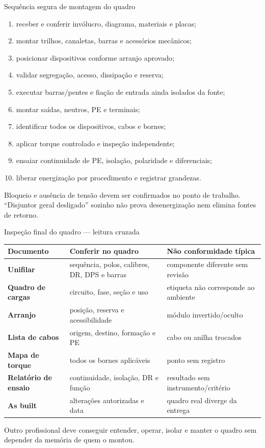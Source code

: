 \begin{frame}{Sequência segura de montagem do quadro}
\scriptsize
\begin{enumerate}
\item receber e conferir invólucro, diagrama, materiais e placas;
\item montar trilhos, canaletas, barras e acessórios mecânicos;
\item posicionar dispositivos conforme arranjo aprovado;
\item validar segregação, acesso, dissipação e reserva;
\item executar barras/pentes e fiação de entrada ainda isolados da fonte;
\item montar saídas, neutros, PE e terminais;
\item identificar todos os dispositivos, cabos e bornes;
\item aplicar torque controlado e inspeção independente;
\item ensaiar continuidade de PE, isolação, polaridade e diferenciais;
\item liberar energização por procedimento e registrar grandezas.
\end{enumerate}
\begin{caixaAt}
Bloqueio e ausência de tensão devem ser confirmados no ponto de trabalho. “Disjuntor geral desligado” sozinho não prova desenergização nem elimina fontes de retorno.
\end{caixaAt}
\end{frame}

\begin{frame}{Inspeção final do quadro — leitura cruzada}
\scriptsize
\begin{tabularx}{\textwidth}{>{\bfseries}p{3.0cm}X X}
\toprule
Documento & Conferir no quadro & Não conformidade típica \\
\midrule
Unifilar & sequência, polos, calibres, DR, DPS e barras & componente diferente sem revisão \\
Quadro de cargas & circuito, fase, seção e uso & etiqueta não corresponde ao ambiente \\
Arranjo & posição, reserva e acessibilidade & módulo invertido/oculto \\
Lista de cabos & origem, destino, formação e PE & cabo ou anilha trocados \\
Mapa de torque & todos os bornes aplicáveis & ponto sem registro \\
Relatório de ensaio & continuidade, isolação, DR e função & resultado sem instrumento/critério \\
As built & alterações autorizadas e data & quadro real diverge da entrega \\
\bottomrule
\end{tabularx}
\begin{caixaProjeto}[title=Resultado esperado]
Outro profissional deve conseguir entender, operar, isolar e manter o quadro sem depender da memória de quem o montou.
\end{caixaProjeto}
\end{frame}
